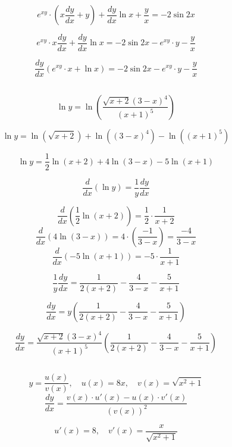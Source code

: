 \documentclass{article}
\begin{document}
\[
e^{xy} \cdot (x \frac{dy}{dx} + y) + \frac{dy}{dx} \ln x + \frac{y}{x} = -2 \sin 2x
\]


\[
e^{xy} \cdot x \frac{dy}{dx} + \frac{dy}{dx} \ln x = -2 \sin 2x - e^{xy} \cdot y - \frac{y}{x}
\]

\[
\frac{dy}{dx} \left( e^{xy} \cdot x + \ln x \right) = -2 \sin 2x - e^{xy} \cdot y - \frac{y}{x}
\]



\subsection{}

\[
\ln y = \ln \left( \frac{\sqrt{x+2}(3-x)^4}{(x+1)^5} \right)
\]

\[
\ln y = \ln \left( \sqrt{x+2} \right) + \ln \left( (3-x)^4 \right) - \ln \left( (x+1)^5 \right)
\]

\[
\ln y = \frac{1}{2} \ln (x+2) + 4 \ln (3-x) - 5 \ln (x+1)
\]

\[
\frac{d}{dx} (\ln y) = \frac{1}{y} \frac{dy}{dx}
\]

\[
\frac{d}{dx} \left( \frac{1}{2} \ln (x+2) \right) = \frac{1}{2} \cdot \frac{1}{x+2}
\]
\[
\frac{d}{dx} \left( 4 \ln (3-x) \right) = 4 \cdot \left( \frac{-1}{3-x} \right) = \frac{-4}{3-x}
\]
\[
\frac{d}{dx} \left( -5 \ln (x+1) \right) = -5 \cdot \frac{1}{x+1}
\]

\[
\frac{1}{y} \frac{dy}{dx} = \frac{1}{2(x+2)} - \frac{4}{3-x} - \frac{5}{x+1}
\]

\[
\frac{dy}{dx} = y \left( \frac{1}{2(x+2)} - \frac{4}{3-x} - \frac{5}{x+1} \right)
\]

\[
\frac{dy}{dx} = \frac{\sqrt{x+2}(3-x)^4}{(x+1)^5} \left( \frac{1}{2(x+2)} - \frac{4}{3-x} - \frac{5}{x+1} \right)
\]




\subsection{}

\[
y = \frac{u(x)}{v(x)}, \quad u(x) = 8x, \quad v(x) = \sqrt{x^2 + 1}
\]
\[
\frac{dy}{dx} = \frac{v(x) \cdot u'(x) - u(x) \cdot v'(x)}{(v(x))^2}
\]

\[
u'(x) = 8, \quad v'(x) = \frac{x}{\sqrt{x^2 + 1}}
\]
\end{document}
